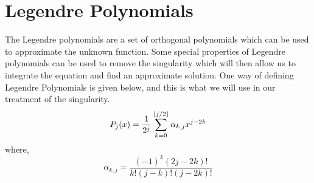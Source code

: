 \documentclass[1p,preprint,12pt]{elsarticle1}
\DeclarePairedDelimiter\floor{\lfloor}{\rfloor}
\begin{document}
\section{Legendre Polynomials}
The Legendre polynomials are a set of orthogonal polynomials which can be used to approximate the unknown function. Some special properties of Legendre polynomials can be used to remove the
singularity which will then allow us to integrate the equation and find an approximate solution. One way of defining Legendre Polynomials is given below, and this is what we will use in 
our treatment of the singularity.
\begin{equation} \label{eq:3}
	P_j(x) = \frac{1}{2^j}\sum_{k=0}^{\floor*{j/2}}\alpha_{k,j}x^{j-2k}
\end{equation}
where,
\begin{equation} \label{eq:4}
	\alpha_{k,j} = \frac{(-1)^{k}(2j-2k)!}{k!(j-k)!(j-2k)!}
\end{equation}
\end{document}
